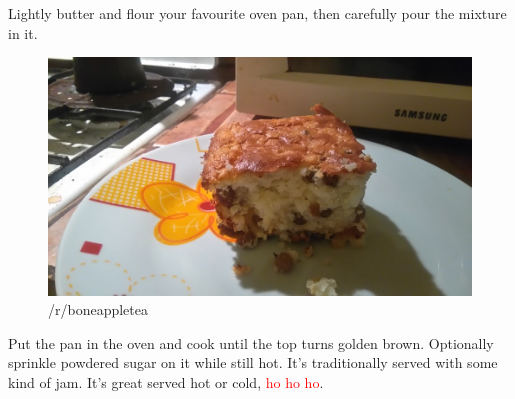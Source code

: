 \documentclass{article}
\begin{document}
Lightly butter and flour your favourite oven pan, then carefully pour the mixture in it. 

\begin{figure}[!htbp]
\centering
\includegraphics[width=\textwidth]{rizskoch_16}
\caption{/r/boneappletea}
\end{figure}

Put the pan in the oven and cook until the top turns golden brown. Optionally sprinkle powdered sugar on it while still hot. It's traditionally served with some kind of jam. It's great served hot or cold, \textcolor{red}{ho ho ho}.
\end{document}
